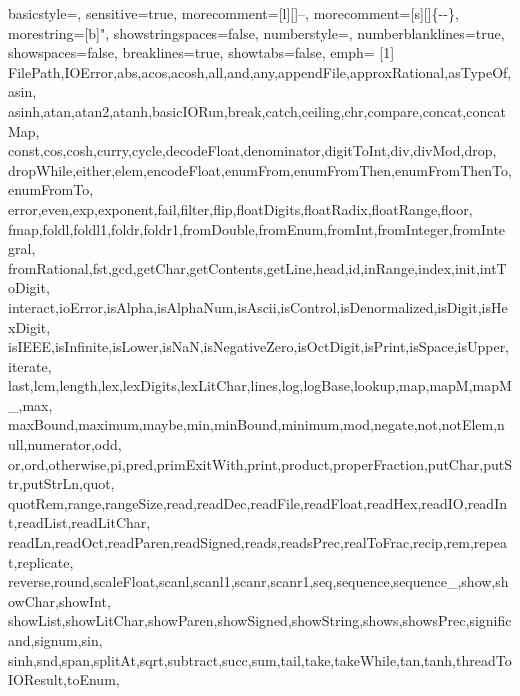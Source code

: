 \renewcommand{\ttdefault}{pcr}
 {
        basicstyle=\ttfamily\small,
        sensitive=true,
        morecomment=[l][\ttfamily\tiny]{--},
        morecomment=[s][\ttfamily\tiny]{\{-}{-\}},
        morestring=[b]",
        showstringspaces=false,
        numberstyle=\tiny,
        numberblanklines=true,
        showspaces=false,
        breaklines=true,
        showtabs=false,
        emph=
        {[1]
                FilePath,IOError,abs,acos,acosh,all,and,any,appendFile,approxRational,asTypeOf,asin,
                asinh,atan,atan2,atanh,basicIORun,break,catch,ceiling,chr,compare,concat,concatMap,
                const,cos,cosh,curry,cycle,decodeFloat,denominator,digitToInt,div,divMod,drop,
                dropWhile,either,elem,encodeFloat,enumFrom,enumFromThen,enumFromThenTo,enumFromTo,
                error,even,exp,exponent,fail,filter,flip,floatDigits,floatRadix,floatRange,floor,
                fmap,foldl,foldl1,foldr,foldr1,fromDouble,fromEnum,fromInt,fromInteger,fromIntegral,
                fromRational,fst,gcd,getChar,getContents,getLine,head,id,inRange,index,init,intToDigit,
                interact,ioError,isAlpha,isAlphaNum,isAscii,isControl,isDenormalized,isDigit,isHexDigit,
                isIEEE,isInfinite,isLower,isNaN,isNegativeZero,isOctDigit,isPrint,isSpace,isUpper,iterate,
                last,lcm,length,lex,lexDigits,lexLitChar,lines,log,logBase,lookup,map,mapM,mapM_,max,
                maxBound,maximum,maybe,min,minBound,minimum,mod,negate,not,notElem,null,numerator,odd,
                or,ord,otherwise,pi,pred,primExitWith,print,product,properFraction,putChar,putStr,putStrLn,quot,
                quotRem,range,rangeSize,read,readDec,readFile,readFloat,readHex,readIO,readInt,readList,readLitChar,
                readLn,readOct,readParen,readSigned,reads,readsPrec,realToFrac,recip,rem,repeat,replicate,
                reverse,round,scaleFloat,scanl,scanl1,scanr,scanr1,seq,sequence,sequence_,show,showChar,showInt,
                showList,showLitChar,showParen,showSigned,showString,shows,showsPrec,significand,signum,sin,
                sinh,snd,span,splitAt,sqrt,subtract,succ,sum,tail,take,takeWhile,tan,tanh,threadToIOResult,toEnum,
}}
